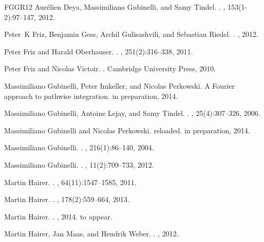 \documentclass[11pt,a4paper]{article}
\theoremstyle{remark}
\begin{document}
\begin{thebibliography}{FGGR12}
Aur{\'e}lien Deya, Massimiliano Gubinelli, and Samy Tindel.
.
, 153(1-2):97--147, 2012.

Peter~K Friz, Benjamin Gess, Archil Gulisashvili, and Sebastian Riedel.
.
, 2012.

Peter Friz and Harald Oberhauser.
.
, 251(2):316--338, 2011.

Peter Friz and Nicolas Victoir.
.
\newblock Cambridge University Press, 2010.

Massimiliano Gubinelli, Peter Imkeller, and Nicolas Perkowski.
\newblock A {F}ourier approach to pathwise integration.
\newblock in preparation, 2014.

Massimiliano Gubinelli, Antoine Lejay, and Samy Tindel.
.
, 25(4):307--326, 2006.

Massimiliano Gubinelli and Nicolas Perkowski.
 reloaded.
\newblock in preparation, 2014.

Massimiliano Gubinelli.
.
, 216(1):86--140, 2004.

Massimiliano Gubinelli.
.
, 11(2):709--733, 2012.

Martin Hairer.
.
, 64(11):1547--1585, 2011.

Martin Hairer.
.
, 178(2):559--664, 2013.

Martin Hairer.
.
, 2014.
\newblock to appear.

Martin Hairer, Jan Maas, and Hendrik Weber.
.
, 2012.


\end{thebibliography}
\end{document}
